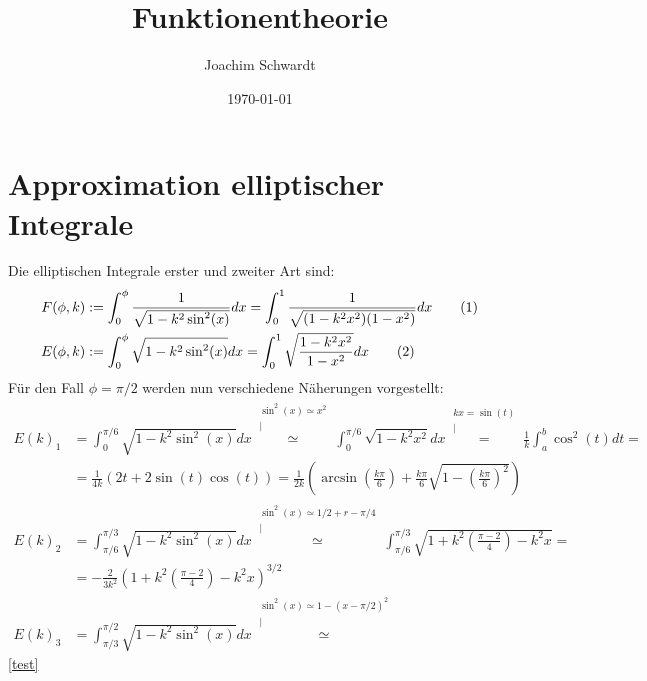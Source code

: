 \documentclass[a4paper,12pt]{article}
\newcommand\numberthis{\addtocounter{equation}{1}\tag{\theequation}}
\begin{document}
\title{Funktionentheorie}
\author{Joachim Schwardt}
\date{\today}
\maketitle

\section{Approximation elliptischer Integrale}
Die elliptischen Integrale erster und zweiter Art sind:
\begin{align*}
F(\phi,k)&:=\int_0^{\phi} \frac{1}{\sqrt{1-k^2\sin^2(x)}}dx =\int_0^1 \frac{1}{\sqrt{(1-k^2x^2)(1-x^2)}}dx  \numberthis\label{F_phi_k} \\
E(\phi,k)&:=\int_0^{\phi} \sqrt{1-k^2\sin^2(x)}dx=\int_0^1 \sqrt{\frac{1-k^2x^2}{1-x^2}}dx \numberthis\label{E_phi_k}
\end{align*}
Für den Fall $\phi=\pi/2$ werden nun verschiedene Näherungen vorgestellt:
\begin{align*}
E(k)_1&=\int_0^{\pi/6}\sqrt{1-k^2\sin^2(x)}dx \overset{\substack{\sin^2(x)\simeq x^2 \\|}}{\simeq}\int_0^{\pi/6}\sqrt{1-k^2x^2}dx\overset{\substack{ kx=\sin(t)\\|}}{=}\frac{1}{k}\int_a^{b}\cos^2(t)dt=  \\
&= \frac{1}{4k}(2t+2\sin(t)\cos(t))=\frac{1}{2k}\left(\arcsin(\frac{k\pi}{6})+\frac{k\pi}{6}\sqrt{1-(\frac{k\pi}{6})^2}\right) \\
E(k)_2&=\int_{\pi/6}^{\pi/3}\sqrt{1-k^2\sin^2(x)}dx\overset{\substack{\sin^2(x)\simeq 1/2+r-\pi/4\\|}}{\simeq}\int_{\pi/6}^{\pi/3}\sqrt{1+k^2(\frac{\pi -2}{4})-k^2x}= \\
&=-\frac{2}{3k^2}\left(1+k^2(\frac{\pi -2}{4})-k^2x\right)^{3/2}   \\
E(k)_3&=\int_{\pi/3}^{\pi/2}\sqrt{1-k^2\sin^2(x)}dx\overset{\substack{\sin^2(x)\simeq 1-(x-\pi/2)^2 \\|}}{\simeq}
\end{align*}
\ref{test} \cite{test}
\end{document}

